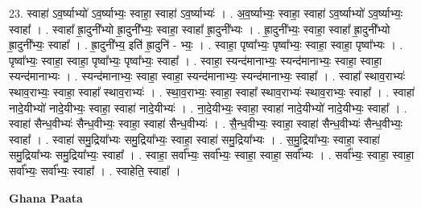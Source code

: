 \documentclass[17pt]{extarticle}
\begin{document}
23. स्वाहा॑ ऽव॒र्ष्याभ्यो॑ ऽव॒र्ष्याभ्यः॒ स्वाहा॒ स्वाहा॑ ऽव॒र्ष्याभ्यः॑ । . अ॒व॒र्ष्याभ्यः॒ स्वाहा॒ स्वाहा॑ ऽव॒र्ष्याभ्यो॑ ऽव॒र्ष्याभ्यः॒ स्वाहा᳚ । . स्वाहा᳚ ह्रा॒दुनी᳚भ्यो ह्रा॒दुनी᳚भ्यः॒ स्वाहा॒ स्वाहा᳚ ह्रा॒दुनी᳚भ्यः । . ह्रा॒दुनी᳚भ्यः॒ स्वाहा॒ स्वाहा᳚ ह्रा॒दुनी᳚भ्यो ह्रा॒दुनी᳚भ्यः॒ स्वाहा᳚ । . ह्रा॒दुनी᳚भ्य॒ इति॑ ह्रा॒दुनि॑ - भ्यः॒ । . स्वाहा॒ पृष्वा᳚भ्यः॒ पृष्वा᳚भ्यः॒ स्वाहा॒ स्वाहा॒ पृष्वा᳚भ्यः । . पृष्वा᳚भ्यः॒ स्वाहा॒ स्वाहा॒ पृष्वा᳚भ्यः॒ पृष्वा᳚भ्यः॒ स्वाहा᳚ । . स्वाहा॒ स्यन्द॑मानाभ्यः॒ स्यन्द॑मानाभ्यः॒ स्वाहा॒ स्वाहा॒ स्यन्द॑मानाभ्यः । . स्यन्द॑मानाभ्यः॒ स्वाहा॒ स्वाहा॒ स्यन्द॑मानाभ्यः॒ स्यन्द॑मानाभ्यः॒ स्वाहा᳚ । . स्वाहा᳚ स्थाव॒राभ्यः॑ स्थाव॒राभ्यः॒ स्वाहा॒ स्वाहा᳚ स्थाव॒राभ्यः॑ । . स्था॒व॒राभ्यः॒ स्वाहा॒ स्वाहा᳚ स्थाव॒राभ्यः॑ स्थाव॒राभ्यः॒ स्वाहा᳚ । . स्वाहा॑ नादे॒यीभ्यो॑ नादे॒यीभ्यः॒ स्वाहा॒ स्वाहा॑ नादे॒यीभ्यः॑ । . ना॒दे॒यीभ्यः॒ स्वाहा॒ स्वाहा॑ नादे॒यीभ्यो॑ नादे॒यीभ्यः॒ स्वाहा᳚ । . स्वाहा॑ सैन्ध॒वीभ्यः॑ सैन्ध॒वीभ्यः॒ स्वाहा॒ स्वाहा॑ सैन्ध॒वीभ्यः॑ । . सै॒न्ध॒वीभ्यः॒ स्वाहा॒ स्वाहा॑ सैन्ध॒वीभ्यः॑ सैन्ध॒वीभ्यः॒ स्वाहा᳚ । . स्वाहा॑ समु॒द्रिया᳚भ्यः समु॒द्रिया᳚भ्यः॒ स्वाहा॒ स्वाहा॑ समु॒द्रिया᳚भ्यः । . स॒मु॒द्रिया᳚भ्यः॒ स्वाहा॒ स्वाहा॑ समु॒द्रिया᳚भ्यः समु॒द्रिया᳚भ्यः॒ स्वाहा᳚ । . स्वाहा॒ सर्वा᳚भ्यः॒ सर्वा᳚भ्यः॒ स्वाहा॒ स्वाहा॒ सर्वा᳚भ्यः । . सर्वा᳚भ्यः॒ स्वाहा॒ स्वाहा॒ सर्वा᳚भ्यः॒ सर्वा᳚भ्यः॒ स्वाहा᳚ । . स्वाहेति॒ स्वाहा᳚ । \newline

\textbf{Ghana Paata } \newline
\end{document}
